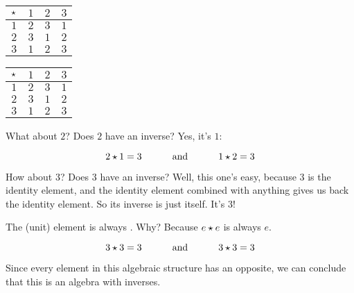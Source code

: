 \documentclass[../../../main.tex]{subfiles}
\begin{document}
\begin{example}
\begin{center}
  \begin{tabular}{| c || c | c | c | }
    \hline
    $\opSymbol/$ & $1$ & \cellcolor{grey3} $2$ & $3$ \\ \hline \hline
    \cellcolor{grey3} $1$          & $2$ & \cellcolor{grey3} $3$ & $1$ \\ \hline
    $2$          & $3$ & $1$ & $2$ \\ \hline
    $3$          & $1$ & $2$ & $3$ \\ \hline
  \end{tabular}
  \hskip 2cm
  \begin{tabular}{| c || c | c | c | }
    \hline
    $\opSymbol/$ & \cellcolor{grey3} $1$ & $2$ & $3$ \\ \hline \hline
    $1$          & $2$ & $3$ & $1$ \\ \hline
    \cellcolor{grey3} $2$          & \cellcolor{grey3} $3$ & $1$ & $2$ \\ \hline
    $3$          & $1$ & $2$ & $3$ \\ \hline
  \end{tabular}
\end{center}

What about $2$? Does $2$ have an inverse? Yes, it's $1$:

\begin{equation*}
  \op{2}{1} = 3 \hskip 1cm \text{ and } \hskip 1cm \op{1}{2} = 3
\end{equation*}

How about $3$? Does $3$ have an inverse? Well, this one's easy, because $3$ is the identity element, and the identity element combined with anything gives us back the identity element. So its inverse is just itself. It's $3$!

\begin{aside}
  \begin{remark}
    The  (unit) element is always . Why? Because $\op{e}{e}$ is always $e$.
  \end{remark}
\end{aside}

\begin{equation*}
  \op{3}{3} = 3 \hskip 1cm \text{ and } \hskip 1cm \op{3}{3} = 3
\end{equation*}

Since every element in this algebraic structure has an opposite, we can conclude that this is an algebra with inverses.

\end{example}
\end{document}
